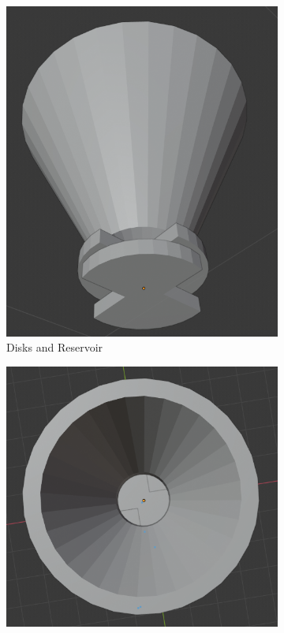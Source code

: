 \begin{figure}[t!]
     \centering
     \begin{subfigure}[b]{0.49\linewidth}
     \includegraphics[width=\linewidth]{img/PlanB.PNG}
     \caption{Disks and Reservoir}
     \label{fig:Disk1}
     \end{subfigure}
     \begin{subfigure}[b]{0.49\linewidth}
     \includegraphics[width=\linewidth]{img/PlanB2.PNG}

\end{subfigure}
\end{figure}
